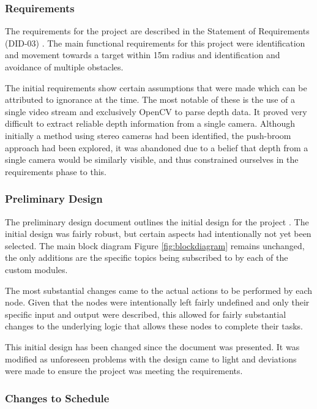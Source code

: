 \documentclass{article}[12]
\begin{document}
		\subsubsection{Requirements}
		
		The requirements for the project are described in the Statement of Requirements (DID-03) \cite{sor}. The main functional requirements for this project were identification and movement towards a target within 15m radius and identification and avoidance of multiple obstacles. 
	
		The initial requirements show certain assumptions that were made which can be attributed to ignorance at the time. The most notable of these is the use of a single video stream and exclusively OpenCV to parse depth data. It proved very difficult to extract reliable depth information from a single camera. Although initially a method using stereo cameras had been identified, the push-broom approach \cite{barry2015pushbroom} had been explored, it was abandoned due to a belief that depth from a single camera would be similarly visible, and thus constrained ourselves in the requirements phase to this.

		\subsubsection{Preliminary Design}
		
		The preliminary design document outlines the initial design for the project \cite{pdd}. The initial design was fairly robust, but certain aspects had intentionally not yet been selected. The main block diagram Figure \ref{fig:blockdiagram} remains unchanged, the only additions are the specific topics being subscribed to by each of the custom modules. 
		
		The most substantial changes came to the actual actions to be performed by each node. Given that the nodes were intentionally left fairly undefined and only their specific input and output were described, this allowed for fairly substantial changes to the underlying logic that allows these nodes to complete their tasks.


This initial design has been changed since the document was presented. It was modified as unforeseen problems with the design came to light and deviations were made to ensure the project was meeting the requirements.


		\subsubsection{Changes to Schedule}
	
\end{document}
